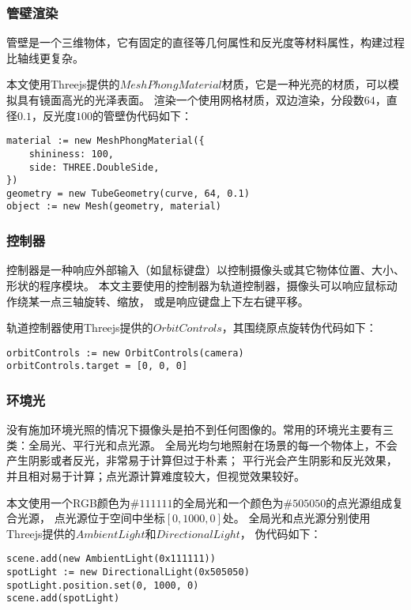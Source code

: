 \subsubsection{管壁渲染}

管壁是一个三维物体，它有固定的直径等几何属性和反光度等材料属性，构建过程比轴线更复杂。

本文使用Threejs提供的$MeshPhongMaterial$材质，它是一种光亮的材质，可以模拟具有镜面高光的光泽表面。
渲染一个使用网格材质，双边渲染，分段数$64$，直径$0.1$，反光度$100$的管壁伪代码如下：

\begin{lstlisting}[caption={渲染管壁}]
material := new MeshPhongMaterial({
    shininess: 100,
    side: THREE.DoubleSide,
})
geometry = new TubeGeometry(curve, 64, 0.1)
object := new Mesh(geometry, material)
\end{lstlisting}

\subsubsection{控制器}
控制器是一种响应外部输入（如鼠标键盘）以控制摄像头或其它物体位置、大小、形状的程序模块。
本文主要使用的控制器为轨道控制器，摄像头可以响应鼠标动作绕某一点三轴旋转、缩放，
或是响应键盘上下左右键平移。

轨道控制器使用Threejs提供的$OrbitControls$，其围绕原点旋转伪代码如下：

\begin{lstlisting}[caption={轨道控制器}]
orbitControls := new OrbitControls(camera)
orbitControls.target = [0, 0, 0]
\end{lstlisting}

\subsubsection{环境光}

没有施加环境光照的情况下摄像头是拍不到任何图像的。常用的环境光主要有三类：全局光、平行光和点光源。
全局光均匀地照射在场景的每一个物体上，不会产生阴影或者反光，非常易于计算但过于朴素；
平行光会产生阴影和反光效果，并且相对易于计算；点光源计算难度较大，但视觉效果较好。

本文使用一个RGB颜色为$\#111111$的全局光和一个颜色为$\#505050$的点光源组成复合光源，
点光源位于空间中坐标$[0, 1000, 0]$处。
全局光和点光源分别使用Threejs提供的$AmbientLight$和$DirectionalLight$，
伪代码如下：

\begin{lstlisting}[caption={环境光}]
scene.add(new AmbientLight(0x111111))
spotLight := new DirectionalLight(0x505050)
spotLight.position.set(0, 1000, 0)
scene.add(spotLight)
\end{lstlisting}

